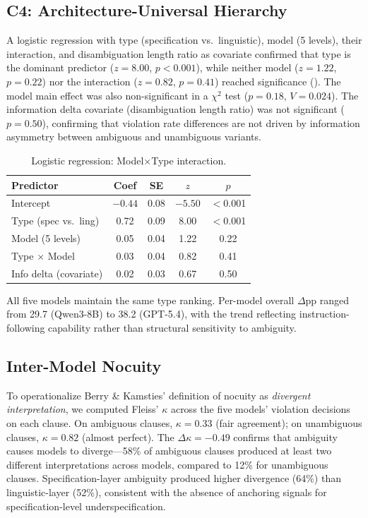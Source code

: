 \documentclass[11pt]{article}
\begin{document}
\subsection{C4: Architecture-Universal Hierarchy}
\label{sec:c4}

A logistic regression with type (specification vs.\ linguistic), model (5 levels), their interaction, and disambiguation length ratio as covariate confirmed that type is the dominant predictor ($z=8.00$, $p<0.001$), while neither model ($z=1.22$, $p=0.22$) nor the interaction ($z=0.82$, $p=0.41$) reached significance (). The model main effect was also non-significant in a $\chi^2$ test ($p=0.18$, $V=0.024$). The information delta covariate (disambiguation length ratio) was not significant ($p=0.50$), confirming that violation rate differences are not driven by information asymmetry between ambiguous and unambiguous variants.

\begin{table}[t]
\centering
\small
\caption{Logistic regression: Model$\times$Type interaction.}
\label{tab:logistic}
\begin{tabular}{lcccc}
\toprule
\textbf{Predictor} & \textbf{Coef} & \textbf{SE} & \textbf{$z$} & \textbf{$p$} \\
\midrule
Intercept & $-0.44$ & 0.08 & $-5.50$ & $<$0.001 \\
Type (spec vs.\ ling) & 0.72 & 0.09 & 8.00 & $<$0.001 \\
Model (5 levels) & 0.05 & 0.04 & 1.22 & 0.22 \\
Type $\times$ Model & 0.03 & 0.04 & 0.82 & 0.41 \\
Info delta (covariate) & 0.02 & 0.03 & 0.67 & 0.50 \\
\bottomrule
\end{tabular}
\end{table}

All five models maintain the same type ranking. Per-model overall $\Delta$pp ranged from 29.7 (Qwen3-8B) to 38.2 (GPT-5.4), with the trend reflecting instruction-following capability rather than structural sensitivity to ambiguity.

\subsection{Inter-Model Nocuity}
\label{sec:nocuity}

To operationalize Berry \& Kamsties' definition of nocuity as \emph{divergent interpretation}, we computed Fleiss' $\kappa$ across the five models' violation decisions on each clause. On ambiguous clauses, $\kappa=0.33$ (fair agreement); on unambiguous clauses, $\kappa=0.82$ (almost perfect). The $\Delta\kappa=-0.49$ confirms that ambiguity causes models to diverge---58\% of ambiguous clauses produced at least two different interpretations across models, compared to 12\% for unambiguous clauses. Specification-layer ambiguity produced higher divergence (64\%) than linguistic-layer (52\%), consistent with the absence of anchoring signals for specification-level underspecification.
\end{document}
